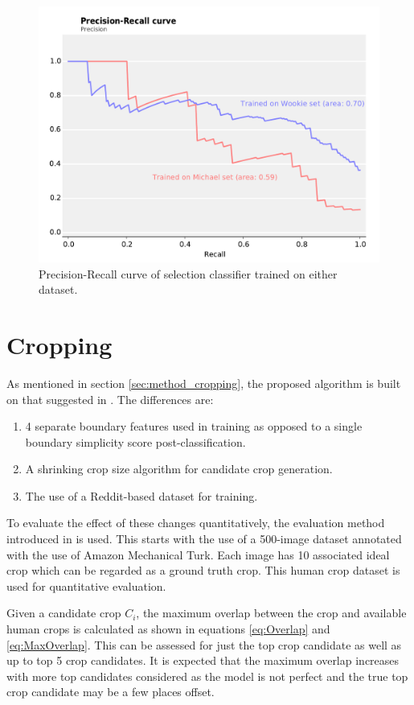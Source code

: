 \begin{figure}
\centering\includegraphics[width=0.8\columnwidth]{../figures/PRcurve.pdf}
\caption{Precision-Recall curve of selection classifier trained on either dataset.\label{fig:PR}}
\end{figure}


\section{Cropping\label{sec:quant_cropping}}

As mentioned in section \ref{sec:method_cropping}, the proposed algorithm is built on that suggested in \cite{fang2014automatic}.
The differences are:

\begin{enumerate}
\item 4 separate boundary features used in training as opposed to a single
      boundary simplicity score post-classification.
\item A shrinking crop size algorithm for candidate crop generation.
\item The use of a Reddit-based dataset for training.
\end{enumerate}

To evaluate the effect of these changes quantitatively, the evaluation method
introduced in \cite{fang2014automatic} is used.
This starts with the use of a 500-image dataset annotated with the use of Amazon Mechanical Turk.
Each image has 10 associated ideal crop which can be regarded as a ground truth crop.
This human crop dataset is used for quantitative evaluation.

Given a candidate crop $C_i$, the maximum overlap between the crop and available
human crops is calculated as shown in equations \ref{eq:Overlap} and \ref{eq:MaxOverlap}.
This can be assessed for just the top crop candidate as well as up to top 5 crop
candidates.
It is expected that the maximum overlap increases with more top candidates
considered as the model is not perfect and the true top crop candidate may be a
few places offset.

